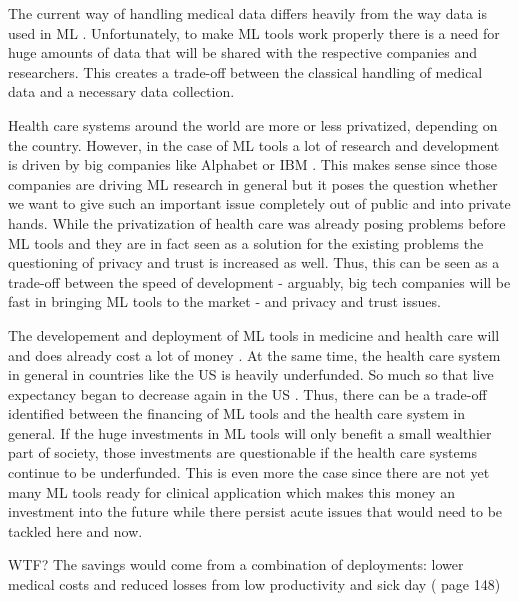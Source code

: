 The current way of handling medical data differs heavily from the way data is used in ML \cite{he2019practical}. Unfortunately, to make ML tools work properly there is a need for huge amounts of data that will be shared with the respective companies and researchers. This creates a trade-off between the classical handling of medical data and a necessary data collection.


Health care systems around the world are more or less privatized, depending on the country. However, in the case of ML tools a lot of research and development is driven by big companies like Alphabet or IBM \cite{Morley2020}. This makes sense since those companies are driving ML research in general but it poses the question whether we want to give such an important issue completely out of public and into private hands. While the privatization of health care was already posing problems before ML tools and they are in fact seen as a solution for the existing problems \cite{Morley2020, topol2019high} the questioning of privacy and trust is increased as well. Thus, this can be seen as a trade-off between the speed of development - arguably, big tech companies will be fast in bringing ML tools to the market - and privacy and trust issues.


The developement and deployment of ML tools in medicine and health care will and does already cost a lot of money  \cite{he2019practical}. At the same time, the health care system in general in countries like the US is heavily underfunded. So much so that live expectancy began to decrease again in the US \cite{topol2019high}. Thus, there can be a trade-off identified between the financing of ML tools and the health care system in general. If the huge investments in ML tools will only benefit a small wealthier part of society, those investments are questionable if the health care systems continue to be underfunded. This is even more the case since there are not yet many ML tools ready for clinical application which makes this money an investment into the future while there persist acute issues that would need to be tackled here and now.


WTF?  The savings would come from a combination of deployments: lower medical costs and reduced losses from low productivity and sick day (\cite{horgan2019artificial} page 148)



